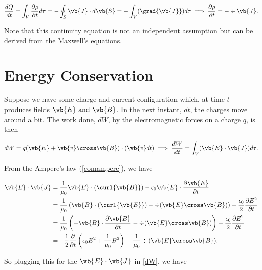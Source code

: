 \documentclass[english,a4paper,12pt]{report}
\begin{document}
\begin{equation}
    \frac{dQ}{dt} = \int_{V}^{} \frac{\partial \rho }{\partial t} d\tau =   -\oint_{S} \vb{J} \cdot d\vb{S}  = -\int_{V}^{} (\grad{\vb{J} } ) d\tau   \implies \frac{\partial \rho }{\partial t} = - \div{\vb{J} }.   \label{contincharge} 
\end{equation}

Note that this continuity equation is not an independent assumption but can be derived from the Maxwell's equations.

\section{Energy Conservation}

Suppose we have some charge and current configuration which, at time \(t\) produces fields \(\vb{E} \text { and } \vb{B} \). In the next instant, \(dt\), the charges move around a bit. The work done, \(dW\), by the electromagnetic forces on a charge \(q\), is then 

\begin{equation}
    dW = q(\vb{E} + \vb{v} \cross \vb{B} ) \cdot (\vb{v} dt) \implies \frac{dW}{dt} = \int_{V}^{} (\vb{E} \cdot \vb{J} )d\tau . \label{dW} 
\end{equation}

From the Ampere's law (\cref{comampere}), we have 

\begin{equation}
    \begin{aligned}
        \vb{E} \cdot \vb{J} &= \frac{1}{\mu_0 } \vb{E} \cdot (\curl{\vb{B} } ) - \epsilon_0 \vb{E} \cdot \frac{\partial \vb{E} }{\partial t} \\
        &= \frac{1}{\mu_0 } \left( \vb{B} \cdot (\curl{\vb{E} } ) - \div{(\vb{E} \cross \vb{B} )}  \right) - \frac{\epsilon_0 }{2} \frac{\partial E^2}{\partial t} \\
        &= \frac{1}{\mu_0 } \left( -\vb{B} \cdot \frac{\partial \vb{B} }{\partial t} - \div{(\vb{E} \cross \vb{B} )}   \right) - \frac{\epsilon_0 }{2} \frac{\partial E^2}{\partial t}\\
        &= -\frac{1}{2} \frac{\partial }{\partial t} \left( \epsilon_0 E^2 + \frac{1}{\mu_0 } B^2  \right)  - \frac{1}{\mu_0 } \div{(\vb{E} \cross \vb{B} )}.         
    \end{aligned}
\end{equation}

So plugging this for the \(\vb{E} \cdot \vb{J} \) in \cref{dW}, we have
\end{document}
